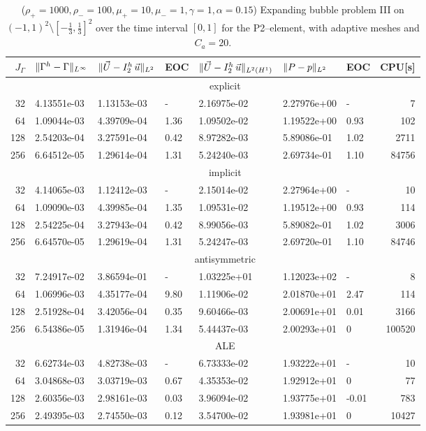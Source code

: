 \begin{table}
\center
\hspace*{-3.25cm}
\begin{tabular}{rllllllr}
\hline
$J_\Gamma$ & $\|\Gamma^h - \Gamma\|_{L^\infty}$ & $\|\vec U - I^h_{2}\,\vec u\|_{L^2}$ & EOC & $\|\vec U - I^h_{2}\,\vec u\|_{L^2(H^1)}$ & $\|P - p\|_{L^2}$ & EOC
& CPU[s] \\
\hline
& \multicolumn{7}{c}{explicit} \\
\hline
 32 & 4.13551e-03 & 1.13153e-03 &    - & 2.16975e-02 & 2.27976e+00 &    - &
7 \\
 64 & 1.09044e-03 & 4.39709e-04 & 1.36 & 1.09502e-02 & 1.19522e+00 & 0.93 &
102 \\
128 & 2.54203e-04 & 3.27591e-04 & 0.42 & 8.97282e-03 & 5.89086e-01 & 1.02 &
2711 \\
256 & 6.64512e-05 & 1.29614e-04 & 1.31 & 5.24240e-03 & 2.69734e-01 & 1.10 &
84756 \\
\hline
& \multicolumn{7}{c}{implicit} \\
\hline
 32 & 4.14065e-03 & 1.12412e-03 &    - & 2.15014e-02 & 2.27964e+00 &    - &
10 \\
 64 & 1.09090e-03 & 4.39985e-04 & 1.35 & 1.09531e-02 & 1.19512e+00 & 0.93 &
114 \\
128 & 2.54225e-04 & 3.27943e-04 & 0.42 & 8.99056e-03 & 5.89082e-01 & 1.02 &
3006 \\
256 & 6.64570e-05 & 1.29619e-04 & 1.31 & 5.24247e-03 & 2.69720e-01 & 1.10 &
84746 \\
\hline
& \multicolumn{7}{c}{antisymmetric} \\
\hline
 32 & 7.24917e-02 & 3.86594e-01 &    - & 1.03225e+01 & 1.12023e+02 &    - &
 8 \\
 64 & 1.06996e-03 & 4.35177e-04 & 9.80 & 1.11906e-02 & 2.01870e+01 & 2.47 &
114 \\
128 & 2.51928e-04 & 3.42056e-04 & 0.35 & 9.60466e-03 & 2.00691e+01 & 0.01 &
3166 \\
256 & 6.54386e-05 & 1.31946e-04 & 1.34 & 5.44437e-03 & 2.00293e+01 &    0 &
100520 \\
\hline
& \multicolumn{7}{c}{ALE} \\
\hline
 32 & 6.62734e-03 & 4.82738e-03 &    - & 6.73333e-02 & 1.93222e+01 &     - &
10 \\
 64 & 3.04868e-03 & 3.03719e-03 & 0.67 & 4.35353e-02 & 1.92912e+01 &     0 &
77 \\
128 & 2.60356e-03 & 2.98161e-03 & 0.03 & 3.96094e-02 & 1.93775e+01 & -0.01 &
783 \\
256 & 2.49395e-03 & 2.74550e-03 & 0.12 & 3.54700e-02 & 1.93981e+01 &     0 &
10427 \\
\hline
\end{tabular}
\hspace*{-3.25cm}
\caption[Navier--Stokes expanding bubble III errors P2--\pdg]
{($\rho_+ = 1000,\rho_- = 100,\mu_+ = 10,\mu_- =1,\gamma = 1,\alpha=0.15$)
Expanding bubble problem III on $(-1,1)^2\setminus[-\frac{1}{3},\frac{1}{3}]^2$
over the time interval $[0,1]$ for the P2--\pdg element, with adaptive
meshes and $C_a=20$\textdegree.}
\label{tab:nsexpandingbubbleIIIp2p1dg}
\end{table}

